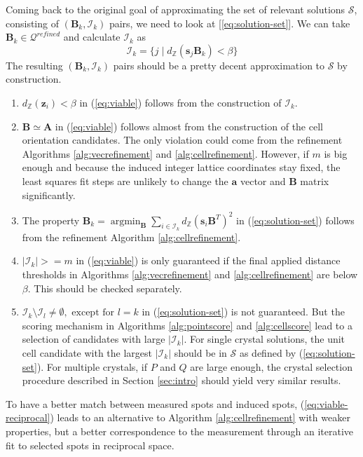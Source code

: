 \documentclass[a4paper,10pt]{article}
\DeclareMathOperator*{\argmin}{argmin}
\newcommand{\vect}[1]{\mathbf{#1}}
\newcommand{\mat}[1]{\mathbf{#1}}
\newcommand{\distZ}[1]{d_\mathbb{Z}(#1)}
\begin{document}
Coming back to the original goal of approximating the set of relevant solutions $\mathcal{S}$, consisting of $(\mat{B}_k, \mathcal{I}_k)$ pairs, we need to look at [\ref{eq:solution-set}]. We can take $\mat{B}_k\in \mathcal{Q}^{refined}$ and calculate $\mathcal{I}_k$ as
%
\[
 \mathcal{I}_k = \{ j \mid \distZ{\vect{s}_j\mat{B}_k} < \beta \}
\]
%
The resulting $(\mat{B}_k, \mathcal{I}_k)$ pairs should be a pretty decent approximation to $\mathcal{S}$ by construction.
%
\begin{enumerate}
 \item $\distZ{\vect{z}_i} < \beta$ in (\ref{eq:viable}) follows from the construction of $\mathcal{I}_k$.
 \item $\mat{B} \simeq \mat{A}$ in (\ref{eq:viable}) follows almost from the construction of the cell orientation candidates. The only violation could come from the refinement Algorithms \ref{alg:vecrefinement} and \ref{alg:cellrefinement}. However, if $m$ is big enough and because the induced integer lattice coordinates stay fixed, the least squares fit steps are unlikely to change the $\vect{a}$ vector and $\mat{B}$ matrix significantly.
 \item The property $\mat{B}_k = \argmin_{\mat{B}} \sum_{i\in \mathcal{I}_k} \distZ{\vect{s}_i\mat{B}^T}^2$ in (\ref{eq:solution-set}) follows from the refinement Algorithm \ref{alg:cellrefinement}.
 \item $|\mathcal{I}_k| >= m$ in (\ref{eq:viable}) is only guaranteed if the final applied distance thresholds in Algorithms \ref{alg:vecrefinement} and \ref{alg:cellrefinement} are below $\beta$. This should be checked separately.
 \item $\mathcal{I}_k \setminus \mathcal{I}_l \neq \emptyset,\text{ except for }l=k$ in (\ref{eq:solution-set}) is not guaranteed. But the scoring mechanism in Algorithms \ref{alg:pointscore} and \ref{alg:cellscore} lead to a selection of candidates with large $|\mathcal{I}_k|$. For single crystal solutions, the unit cell candidate with the largest $|\mathcal{I}_k|$ should be in $\mathcal{S}$ as defined by (\ref{eq:solution-set}). For multiple crystals, if $P$ and $Q$ are large enough, the crystal selection procedure described in Section \ref{sec:intro} should yield very similar results.
\end{enumerate}
%
To have a better match between measured spots and induced spots, (\ref{eq:viable-reciprocal}) leads to an alternative to Algorithm \ref{alg:cellrefinement} with weaker properties, but a better correspondence to the measurement through an iterative fit to selected spots in reciprocal space.
\end{document}
